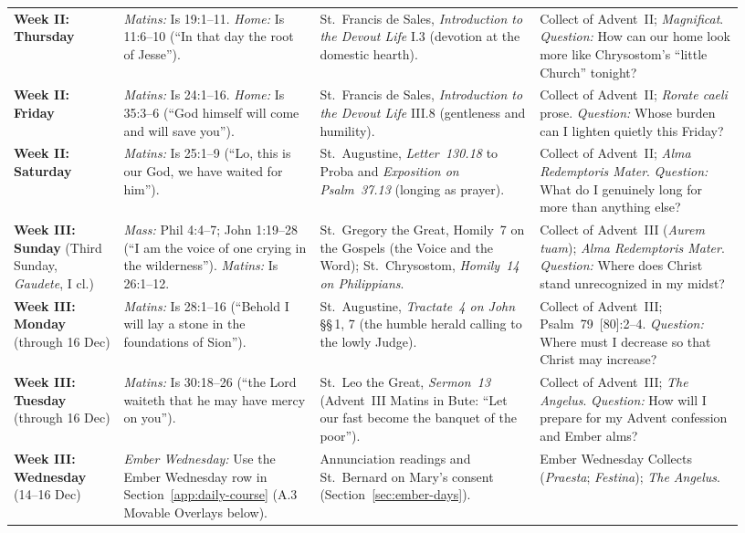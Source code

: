 {\begin{longtable}{>{\raggedright\arraybackslash}p{0.14\linewidth}>{\raggedright\arraybackslash}p{0.25\linewidth}>{\raggedright\arraybackslash}p{0.28\linewidth}>{\raggedright\arraybackslash}p{0.26\linewidth}}
\textbf{Week II: Thursday} & \textit{Matins:} Is 19:1--11. \textit{Home:} Is 11:6--10 (``In that day the root of Jesse''). & St.~Francis de Sales, \textit{Introduction to the Devout Life} I.3 (devotion at the domestic hearth). & Collect of Advent~II; \textit{Magnificat}. \textit{Question:} How can our home look more like Chrysostom's ``little Church'' tonight?\\
\textbf{Week II: Friday} & \textit{Matins:} Is 24:1--16. \textit{Home:} Is 35:3--6 (``God himself will come and will save you''). & St.~Francis de Sales, \textit{Introduction to the Devout Life} III.8 (gentleness and humility). & Collect of Advent~II; \textit{Rorate caeli} prose. \textit{Question:} Whose burden can I lighten quietly this Friday?\\
\textbf{Week II: Saturday} & \textit{Matins:} Is 25:1--9 (``Lo, this is our God, we have waited for him''). & St.~Augustine, \textit{Letter~130.18} to Proba and \textit{Exposition on Psalm~37.13} (longing as prayer). & Collect of Advent~II; \textit{Alma Redemptoris Mater}. \textit{Question:} What do I genuinely long for more than anything else?\\
\textbf{Week III: Sunday} (Third Sunday, \textit{Gaudete}, I cl.) & \textit{Mass:} Phil 4:4--7; John 1:19--28 (``I am the voice of one crying in the wilderness''). \textit{Matins:} Is 26:1--12. & St.~Gregory the Great, Homily~7 on the Gospels (the Voice and the Word); St.~Chrysostom, \textit{Homily~14 on Philippians}. & Collect of Advent~III (\textit{Aurem tuam}); \textit{Alma Redemptoris Mater}. \textit{Question:} Where does Christ stand unrecognized in my midst?\\
\textbf{Week III: Monday} (through 16 Dec) & \textit{Matins:} Is 28:1--16 (``Behold I will lay a stone in the foundations of Sion''). & St.~Augustine, \textit{Tractate~4 on John} \S\S\,1, 7 (the humble herald calling to the lowly Judge). & Collect of Advent~III; Psalm~79~[80]:2--4. \textit{Question:} Where must I decrease so that Christ may increase?\\
\textbf{Week III: Tuesday} (through 16 Dec) & \textit{Matins:} Is 30:18--26 (``the Lord waiteth that he may have mercy on you''). & St.~Leo the Great, \textit{Sermon~13} (Advent~III Matins in Bute: ``Let our fast become the banquet of the poor''). & Collect of Advent~III; \textit{The Angelus}. \textit{Question:} How will I prepare for my Advent confession and Ember alms?\\
\textbf{Week III: Wednesday} (14--16 Dec) & \textit{Ember Wednesday:} Use the Ember Wednesday row in Section~\ref{app:daily-course} (A.3 Movable Overlays below). & Annunciation readings and St.~Bernard on Mary's consent (Section~\ref{sec:ember-days}). & Ember Wednesday Collects (\textit{Praesta}; \textit{Festina}); \textit{The Angelus}.\\

\end{longtable}}

